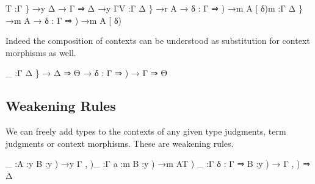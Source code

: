 \documentclass{acm_proc_article-sp}
\begin{document}
\begin{code}%
\>\AgdaFunction{
\_[\_]}T   :\AgdaBound{\{}Γ \} →y Δ → Γ ⇒ Δ →y Γ\AgdaFunction{
\_[\_]}V   :\AgdaBound{\{}Γ Δ \} →r A → \AgdaBound{(}δ : Γ ⇒ ) →m \AgdaBound{(}A [ δ\AgdaFunction{ ]})m  :\AgdaBound{\{}Γ Δ \} →m A → \AgdaBound{(}δ : Γ ⇒ ) →m \AgdaBound{(}A [ δ\AgdaFunction{ ]})    
\<%
\end{code}
Indeed the
composition of contexts can be understood as substitution for context morphisms as well.

\begin{code}%
\>\_ :\AgdaBound{\{}Γ Δ \} → Δ ⇒ Θ → \AgdaBound{(}δ : Γ ⇒ ) → Γ ⇒ Θ   
\<%
\end{code}



\subsection{Weakening Rules}

We can freely add types to the contexts of any given type judgments,
term judgments or context morphisms. These are weakening rules.

\begin{code}%
\>\_   :\AgdaBound{\{}\AgdaBound{(}A :y \AgdaBound{(}B :y ) →y \AgdaBound{(}Γ , )\_  :\AgdaBound{\{}Γ \AgdaBound{(}a :m \AgdaBound{(}B :y ) →m \AgdaBound{(}A\AgdaFunction{ +}T )   \_   :\AgdaBound{\{}Γ \AgdaBound{(}δ : Γ ⇒ \AgdaBound{(}B :y ) → \AgdaBound{(}Γ , ) ⇒ Δ   
\<%
\end{code}
\end{document}
